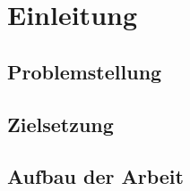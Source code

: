 \section{Einleitung}

\subsection{Problemstellung}


\subsection{Zielsetzung}
\subsection{Aufbau der Arbeit}